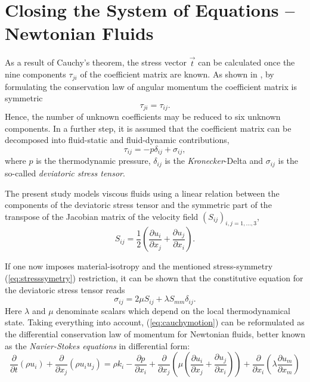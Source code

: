 \section{Closing the System of Equations -- Newtonian Fluids}
\label{sec:fundclosing}

As a result of Cauchy's theorem, the stress vector \( \vec{t} \) can be calculated once the nine components \(\tau_{ji}\) of the coefficient matrix are known. As shown in \cite{kundu12,spurk10}, by formulating the conservation law of angular momentum the coefficient matrix is symmetric
\begin{equation}
  \label{eq:stresssymetry}
  \tau_{ji} = \tau_{ij}.
\end{equation}
Hence, the number of unknown coefficients may be reduced to six unknown components. In a further step, it is assumed that the coefficient matrix can be decomposed into fluid-static and fluid-dynamic contributions,
\begin{displaymath}
  \tau_{ij} = -p \delta_{ij} + \sigma_{ij},
\end{displaymath}
where \(p\) is the thermodynamic pressure, \(\delta_{ij}\) is the \emph{Kronecker}-Delta and \( \sigma_{ij} \) is the so-called \emph{deviatoric stress tensor}. 
    
The present study models viscous fluids using a linear relation between the components of the deviatoric stress tensor and the symmetric part of the transpose of the Jacobian matrix of the velocity field \(\left( S_{ij} \right)_{i,j=1,\dots,3}\),
\begin{displaymath}
  S_{ij} = \frac{1}{2} \left( \frac{\partial u_i}{\partial x_j} + \frac{\partial u_j}{\partial x_i} \right).
\end{displaymath}

If one now imposes material-isotropy and the mentioned stress-symmetry (\ref{eq:stresssymetry}) restriction, it can be shown \cite{aris62} that the constitutive equation for the deviatoric stress tensor reads 
\begin{displaymath}
  \sigma_{ij} = 2 \mu S_{ij} + \lambda S_{mm} \delta_{ij}.
\end{displaymath}
Here \(\lambda\) and \(\mu\) denominate scalars which depend on the local thermodynamical state. Taking everything into account, (\ref{eq:cauchymotion}) can be reformulated as the differential conservation law of momentum for Newtonian fluids, better known as the \emph{Navier-Stokes equations} in differential form:
\begin{equation}
\label{eq:nsfull}
\frac{\partial }{\partial t} \left(\rho u_i \right)
+ \frac{\partial}{\partial x_j} \left( \rho u_i  u_j \right) 
= \rho k_i
- \frac{\partial p}{\partial x_i}
+ \frac{\partial}{\partial x_j} \left( \mu  \left( \frac{\partial u_i}{\partial x_j} 
                                        + \frac{\partial u_j}{\partial x_i} \right) \right)
+ \frac{\partial}{\partial x_i} \left(\lambda \frac{\partial u_m}{\partial x_m} \right)
\end{equation}

